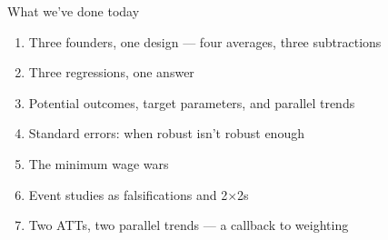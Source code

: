\documentclass[aspectratio=169,11pt]{beamer}
\begin{document}

\begin{frame}{What we've done today}
\vspace{0.3em}
\begin{enumerate}
  \item Three founders, one design --- four averages, three subtractions
  \item Three regressions, one answer
  \item Potential outcomes, target parameters, and parallel trends
  \item Standard errors: when robust isn't robust enough
  \item The minimum wage wars
  \item Event studies as falsifications and 2$\times$2s
  \item Two ATTs, two parallel trends --- a callback to weighting
\end{enumerate}
\end{frame}

\end{document}
